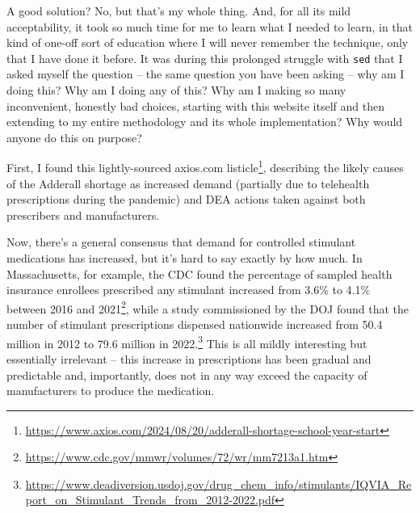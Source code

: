 \documentclass[11pt]{article}
\begin{document}

    A good solution? No, but that's my whole thing. And, for all its mild acceptability, it took so much time for me to learn what I needed to learn, in that kind of one-off sort of education where I will never remember the technique, only that I have done it before. It was during this prolonged struggle with \texttt{sed} that I asked myself the question -- the same question you have been asking -- why am I doing this? Why am I doing any of this? Why am I making so many inconvenient, honestly bad choices, starting with this website itself and then extending to my entire methodology and its whole implementation? Why would anyone do this on purpose? 

    First, I found this lightly-sourced axios.com listicle\footnote{\url{https://www.axios.com/2024/08/20/adderall-shortage-school-year-start}}, describing the likely causes of the Adderall shortage as increased demand (partially due to telehealth prescriptions during the pandemic) and DEA actions taken against both prescribers and manufacturers. 

    Now, there's a general consensus that demand for controlled stimulant medications has increased, but it's hard to say exactly by how much. In Massachusetts, for example, the CDC found the percentage of sampled health insurance enrollees prescribed any stimulant increased from 3.6\% to 4.1\% between 2016 and 2021\footnote{\url{https://www.cdc.gov/mmwr/volumes/72/wr/mm7213a1.htm}}, while a study commissioned by the DOJ found that the number of stimulant prescriptions dispensed nationwide increased from 50.4 million in 2012 to 79.6 million in 2022.\footnote{\url{https://www.deadiversion.usdoj.gov/drug_chem_info/stimulants/IQVIA_Report_on_Stimulant_Trends_from_2012-2022.pdf}} This is all mildly interesting but essentially irrelevant -- this increase in prescriptions has been gradual and predictable and, importantly, does not in any way exceed the capacity of manufacturers to produce the medication. 
\end{document}
